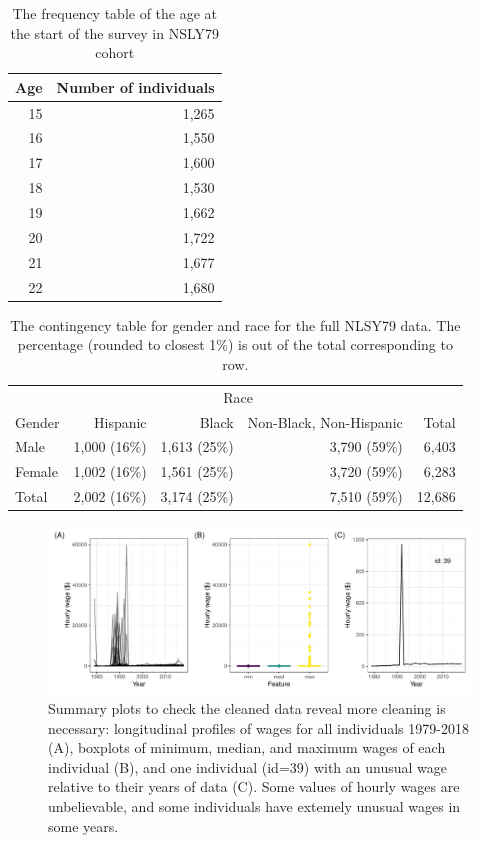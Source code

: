 \documentclass{article}
\begin{document}
\begin{table}

\caption{\label{tab:age-table}The frequency table of the age at the start of the survey in NSLY79 cohort}
\centering
\begin{tabular}[t]{rr}
\toprule
Age & Number of individuals\\
\midrule
15 & 1,265\\
16 & 1,550\\
17 & 1,600\\
18 & 1,530\\
19 & 1,662\\
20 & 1,722\\
21 & 1,677\\
22 & 1,680\\
\bottomrule
\end{tabular}
\end{table}

\begin{table}

\caption{\label{tab:gender-race-table}The contingency table for gender and race for the full NLSY79 data. The percentage (rounded to closest 1\%) is out of the total corresponding to row.}
\centering
\begin{tabular}[t]{lrrrr}
\toprule
\multicolumn{1}{c}{ } & \multicolumn{3}{c}{Race} & \multicolumn{1}{c}{ } \\
\cmidrule(l{3pt}r{3pt}){2-4}
Gender & Hispanic & Black & Non-Black, Non-Hispanic & Total\\
\midrule
Male & 1,000 (16\%) & 1,613 (25\%) & 3,790 (59\%) & 6,403\\
Female & 1,002 (16\%) & 1,561 (25\%) & 3,720 (59\%) & 6,283\\
\midrule
Total & 2,002 (16\%) & 3,174 (25\%) & 7,510 (59\%) & 12,686\\
\bottomrule
\end{tabular}
\end{table}

\begin{figure}

{\centering \includegraphics[width=1\linewidth]{figures/feature-plot-1} 

}

\caption{Summary plots to check the cleaned data reveal more cleaning is necessary: longitudinal profiles of wages for all individuals 1979-2018 (A), boxplots of minimum, median, and maximum wages of each individual (B), and one individual (id=39) with an unusual wage relative to their years of data (C). Some values of hourly wages are unbelievable, and some individuals have extemely unusual wages in some years.}\label{fig:feature-plot}
\end{figure}
\end{document}
